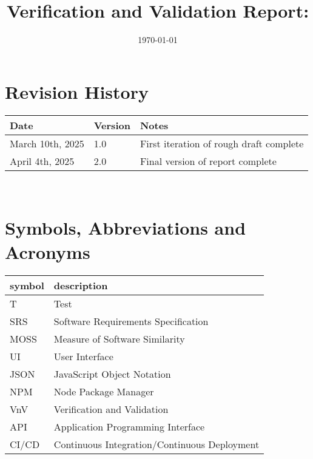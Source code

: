 \documentclass[12pt, titlepage]{article}
\begin{document}
\title{Verification and Validation Report: \progname} 
\author{\authname}
\date{\today}
	
\maketitle


\section{Revision History}

\begin{tabularx}{\textwidth}{p{3cm}p{2cm}X}
\toprule {\bf Date} & {\bf Version} & {\bf Notes}\\
\midrule
March 10th, 2025 & 1.0 & First iteration of rough draft complete\\
April 4th, 2025 & 2.0 & Final version of report complete\\
\bottomrule
\end{tabularx}

~\newpage

\section{Symbols, Abbreviations and Acronyms}

\renewcommand{\arraystretch}{1.2}
\begin{tabular}{l l} 
  \toprule		
  \textbf{symbol} & \textbf{description}\\
  \midrule 
  T & Test\\
  SRS & Software Requirements Specification \\
  MOSS & Measure of Software Similarity \\
  UI & User Interface \\
  JSON & JavaScript Object Notation \\
  NPM & Node Package Manager \\
  VnV & Verification and Validation \\
  API & Application Programming Interface \\
  CI/CD & Continuous Integration/Continuous Deployment\\
  \bottomrule
\end{tabular}\\

\newpage

\tableofcontents

\listoftables %
\end{document}
